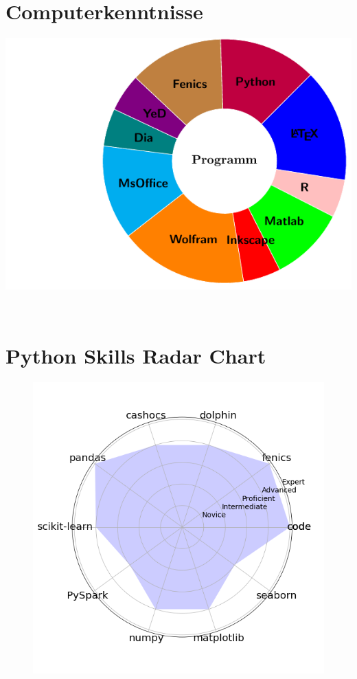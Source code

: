 \documentclass[a4paper]{cv-class}
\let\oldincludegraphics\includegraphics
\renewcommand\includegraphics[2][]{%
  \oldincludegraphics[#1,max width=10cm,max height=\textheight]{#2}
}
\begin{document}
\begin{aside}
\section{Computerkenntnisse}
  
  \hspace{-.8cm}
    \includegraphics[width=\textwidth,height=\textheight,keepaspectratio]{img/software.pdf} 
    ~
\section{Python Skills Radar Chart}
\begin{figure}[h]
\flushleft 
\includegraphics[width=1.0\textwidth]{skills_radar_chart.png}
\end{figure}

\end{aside}
\end{document}
